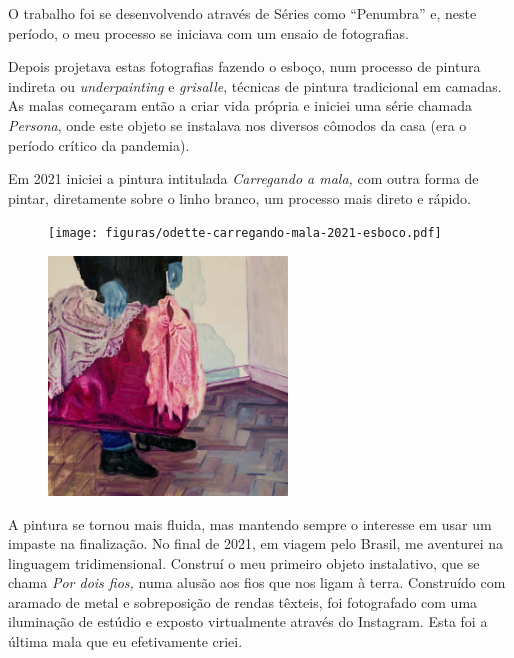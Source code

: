O trabalho foi se desenvolvendo através de Séries como
\enquote{Penumbra} e, neste período, o meu processo se iniciava com um
ensaio de fotografias.

Depois projetava estas fotografias fazendo o esboço, num processo de
pintura indireta ou \emph{underpainting} e \emph{grisalle}, técnicas de
pintura tradicional em camadas. As malas começaram então a criar vida
própria e iniciei uma série chamada \emph{Persona}, onde este objeto se
instalava nos diversos cômodos da casa (era o período crítico da
pandemia).

Em 2021 iniciei a pintura intitulada \emph{Carregando a mala,} com
outra forma de pintar, diretamente sobre o linho branco, um processo
mais direto e rápido.

\begin{figure}
\begin{minipage}{.45\linewidth}
	\caption{}
	\texttt{[image: figuras/odette-carregando-mala-2021-esboco.pdf]}
\end{minipage}\hfill
  \begin{minipage}{.45\linewidth}
	\caption{}
	\includegraphics[height=2.49903in]{figuras/odette-carregando-mala-2021.pdf.compressed.pdf}
\end{minipage}
\end{figure}

A pintura se tornou mais fluida, mas mantendo sempre o interesse em
usar um impaste na finalização. No final de 2021, em viagem pelo
Brasil, me aventurei na linguagem tridimensional. Construí o meu
primeiro objeto instalativo, que se chama \emph{Por dois fios,} numa
alusão aos fios que nos ligam à terra. Construído com aramado de metal
e sobreposição de rendas têxteis, foi fotografado com uma iluminação de
estúdio e exposto virtualmente através do Instagram. Esta foi a última
mala que eu efetivamente criei.


